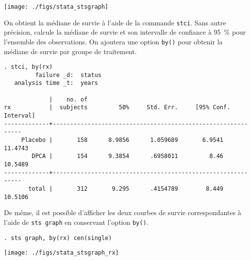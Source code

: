 \texttt{[image: ./figs/stata\_stsgraph]}

On obtient la médiane de survie à l'aide de la commande \verb|stci|. Sans
autre précision, \Stata calcule la médiane de survie et son intervalle de
confiance à 95~\% pour l'ensemble des observations. On ajoutera une option
\verb|by()| pour obtenir la médiane de survie par groupe de traitement.
\begin{verbatim}
. stci, by(rx)
         failure _d:  status
   analysis time _t:  years

             |    no. of 
rx           |  subjects         50%     Std. Err.     [95% Conf. Interval]
-------------+-------------------------------------------------------------
     Placebo |       158      8.9856      1.059689       6.9541    11.4743
        DPCA |       154      9.3854      .6958011         8.46    10.5489
-------------+-------------------------------------------------------------
       total |       312       9.295      .4154789        8.449    10.5106
\end{verbatim}

De même, il est possible d'afficher les deux courbes de survie
correspondantes à l'aide de \verb|sts graph| en conservant l'option
\verb|by()|.
\begin{verbatim}
. sts graph, by(rx) cen(single)
\end{verbatim}

\texttt{[image: ./figs/stata\_stsgraph\_rx]}

